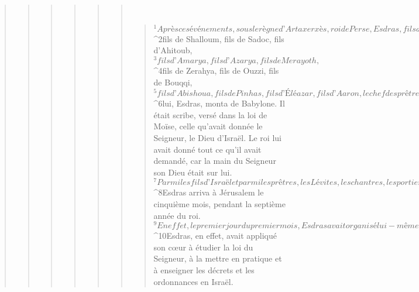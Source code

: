 \begin{verse}
\begin{verse}
\begin{verse}
\begin{verse}
\begin{verse}
\begin{verse}
         
      \bchapter{}
      \begin{verse}
${}^{1}Après ces événements, sous le règne d’Artaxerxès, roi de Perse, Esdras, fils de Seraya, fils d’Azarya, fils de Hilqiya, 
${}^{2}fils de Shalloum, fils de Sadoc, fils d’Ahitoub, 
${}^{3}fils d’Amarya, fils d’Azarya, fils de Merayoth, 
${}^{4}fils de Zerahya, fils de Ouzzi, fils de Bouqqi, 
${}^{5}fils d’Abishoua, fils de Pinhas, fils d’Éléazar, fils d’Aaron, le chef des prêtres, 
${}^{6}lui, Esdras, monta de Babylone. Il était scribe, versé dans la loi de Moïse, celle qu’avait donnée le Seigneur, le Dieu d’Israël. Le roi lui avait donné tout ce qu’il avait demandé, car la main du Seigneur son Dieu était sur lui. 
${}^{7}Parmi les fils d’Israël et parmi les prêtres, les Lévites, les chantres, les portiers et les servants, quelques-uns montèrent à Jérusalem, la septième année du roi Artaxerxès. 
${}^{8}Esdras arriva à Jérusalem le cinquième mois, pendant la septième année du roi. 
${}^{9}En effet, le premier jour du premier mois, Esdras avait organisé lui-même le voyage depuis Babylone. Le premier jour du cinquième mois, il arriva à Jérusalem, car la main bienfaisante de son Dieu était sur lui. 
${}^{10}Esdras, en effet, avait appliqué son cœur à étudier la loi du Seigneur, à la mettre en pratique et à enseigner les décrets et les ordonnances en Israël.
      

\end{verse}
\end{verse}
\end{verse}
\end{verse}
\end{verse}
\end{verse}
\end{verse}
